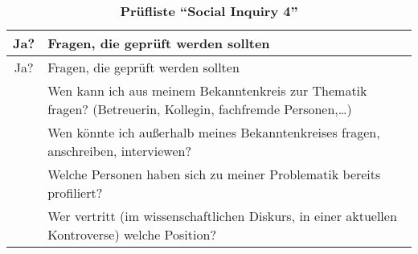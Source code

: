 \documentclass[]{article}
\begin{document}
\begin{longtable}[]{@{}cl@{}}
\caption{\textbf{Prüfliste ``Social Inquiry 4''}}\tabularnewline
\toprule
\begin{minipage}[b]{0.27\columnwidth}\centering\strut
Ja?\strut
\end{minipage} & \begin{minipage}[b]{0.67\columnwidth}\raggedright\strut
Fragen, die geprüft werden sollten\strut
\end{minipage}\tabularnewline
\midrule
\endfirsthead
\toprule
\begin{minipage}[b]{0.27\columnwidth}\centering\strut
Ja?\strut
\end{minipage} & \begin{minipage}[b]{0.67\columnwidth}\raggedright\strut
Fragen, die geprüft werden sollten\strut
\end{minipage}\tabularnewline
\midrule
\endhead
\begin{minipage}[t]{0.27\columnwidth}\centering\strut
\strut
\end{minipage} & \begin{minipage}[t]{0.67\columnwidth}\raggedright\strut
Wen kann ich aus meinem Bekanntenkreis zur Thematik fragen? (Betreuerin,
Kollegin, fachfremde Personen,\ldots{})\strut
\end{minipage}\tabularnewline
\begin{minipage}[t]{0.27\columnwidth}\centering\strut
\strut
\end{minipage} & \begin{minipage}[t]{0.67\columnwidth}\raggedright\strut
Wen könnte ich außerhalb meines Bekanntenkreises fragen, anschreiben,
interviewen?\strut
\end{minipage}\tabularnewline
\begin{minipage}[t]{0.27\columnwidth}\centering\strut
\strut
\end{minipage} & \begin{minipage}[t]{0.67\columnwidth}\raggedright\strut
Welche Personen haben sich zu meiner Problematik bereits
profiliert?\strut
\end{minipage}\tabularnewline
\begin{minipage}[t]{0.27\columnwidth}\centering\strut
\strut
\end{minipage} & \begin{minipage}[t]{0.67\columnwidth}\raggedright\strut
Wer vertritt (im wissenschaftlichen Diskurs, in einer aktuellen
Kontroverse) welche Position?\strut
\end{minipage}\tabularnewline

\end{longtable}
\end{document}
